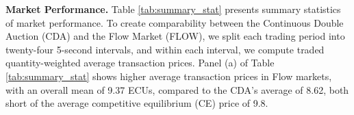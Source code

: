 \vspace{0.5cm}
\noindent \textbf{Market Performance.} 
Table \ref{tab:summary_stat} presents summary statistics of market performance. To create comparability between the Continuous Double Auction (CDA) and the Flow Market (FLOW), we split each trading period into twenty-four 5-second intervals, and within each interval, we compute traded quantity-weighted average transaction prices. 
Panel (a) of Table \ref{tab:summary_stat} %
shows higher average transaction prices in Flow markets, with an overall mean of 9.37 ECUs, compared to the CDA’s average of 8.62, both short of the average competitive equilibrium (CE) price of 9.8. %



